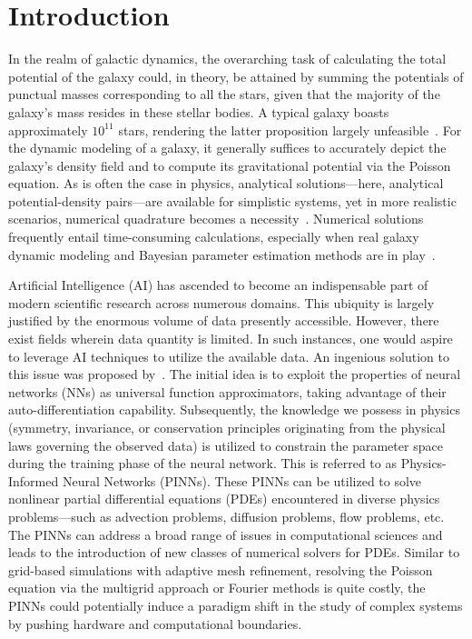 \chapter{Introduction}\label{ch:intro}
In the realm of galactic dynamics, the overarching task of calculating the total potential of the galaxy could, in theory, be attained by summing the potentials of punctual masses corresponding to all the stars, given that the majority of the galaxy's mass resides in these stellar bodies. A typical galaxy boasts approximately $10^{11}$ stars, rendering the latter proposition largely unfeasible~\cite{binney2011galactic}. For the dynamic modeling of a galaxy, it generally suffices to accurately depict the galaxy's density field and to compute its gravitational potential via the Poisson equation. As is often the case in physics, analytical solutions—here, analytical potential-density pairs—are available for simplistic systems, yet in more realistic scenarios, numerical quadrature becomes a necessity~\cite{caravita_jeans_2021}. Numerical solutions frequently entail time-consuming calculations, especially when real galaxy dynamic modeling and Bayesian parameter estimation methods are in play~\cite{rigamonti2022maximally}.

Artificial Intelligence (AI) has ascended to become an indispensable part of modern scientific research across numerous domains. This ubiquity is largely justified by the enormous volume of data presently accessible. However, there exist fields wherein data quantity is limited. In such instances, one would aspire to leverage AI techniques to utilize the available data. An ingenious solution to this issue was proposed by~\cite{raissi_physics_2017}. The initial idea is to exploit the properties of neural networks (NNs) as universal function approximators, taking advantage of their auto-differentiation capability. Subsequently, the knowledge we possess in physics (symmetry, invariance, or conservation principles originating from the physical laws governing the observed data) is utilized to constrain the parameter space during the training phase of the neural network. This is referred to as Physics-Informed Neural Networks (PINNs). These PINNs can be utilized to solve nonlinear partial differential equations (PDEs) encountered in diverse physics problems—such as advection problems, diffusion problems, flow problems, etc. The PINNs can address a broad range of issues in computational sciences and leads to the introduction of new classes of numerical solvers for PDEs. Similar to grid-based simulations with adaptive mesh refinement, resolving the Poisson equation via the multigrid approach or Fourier methods is quite costly, the PINNs could potentially induce a paradigm shift in the study of complex systems by pushing hardware and computational boundaries.


